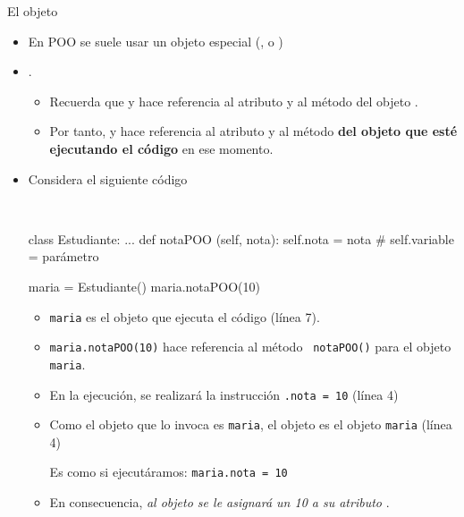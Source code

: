 \documentclass[10pt,envcountsect,spanish]{beamer}
\begin{document}
\begin{frame}[fragile=singleslide]{El objeto }

\begin{itemize}
\item En POO se suele usar un objeto especial (,  o ) 
\item {}.

\begin{itemize}
\item Recuerda que  y  hace referencia al atributo  y al método  del objeto .

\item Por tanto,   y  hace referencia al atributo  y al método  \textbf{del objeto que esté ejecutando el código} en ese momento.
\end{itemize}


\item \unEjemplo Considera el siguiente código 

{\footnotesize\tt
\begin{pyverbatim}[][frame=single, numbers=left]
class Estudiante:
   ...
   def notaPOO (self, nota):
       self.nota = nota  # self.variable = parámetro

maria = Estudiante()
maria.notaPOO(10)
\end{pyverbatim}
}



\begin{itemize}[nosep] \footnotesize
\item \texttt{maria} es el objeto que ejecuta el código (línea 7).
\item \texttt{maria}\texttt{\color{blue}.notaPOO({\color{gray}10})}   hace referencia  al método \texttt{\color{blue} notaPOO()} para el objeto \texttt{maria}.
\item En la ejecución,  se realizará la instrucción \texttt{.nota = 10} (línea 4)
\item Como el objeto que lo invoca es \texttt{maria},  el objeto  es el objeto \; \texttt{maria} (línea 4)

Es como si ejecutáramos:  \texttt{maria.nota = 10} 
\item En consecuencia, \textit{al objeto  se le asignará un 10 a su atributo} .
\end{itemize}
\end{itemize}
\end{frame}
\end{document}
